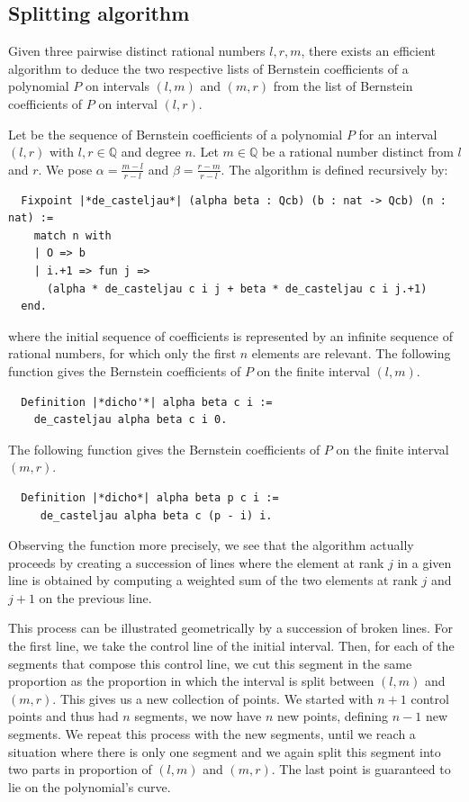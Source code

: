 \documentclass{mscs}
\begin{document}
\subsection{Splitting algorithm}\label{ssec:split}

Given three pairwise distinct rational numbers $l, r, m$,
there exists an efficient algorithm to deduce the two respective lists
of Bernstein coefficients of a polynomial $P$ on intervals $(l, m)$
and $(m, r)$ from the list of Bernstein coefficients of $P$ on
interval $(l, r)$.

Let  be the sequence of Bernstein coefficients of a polynomial $P$
for an interval \((l,r)\) with \(l, r\in \mathbb{Q}\) and degree \(n\).
Let $m\in \mathbb{Q}$ be a rational number
distinct from $l$ and $r$. We pose
$\alpha = \frac{m - l}{r - l}$ and $\beta = \frac{r - m}{r - l}$. The
 algorithm is defined recursively by:
\begin{lstlisting}
  Fixpoint |*de_casteljau*| (alpha beta : Qcb) (b : nat -> Qcb) (n : nat) :=
    match n with
    | O => b
    | i.+1 => fun j =>
      (alpha * de_casteljau c i j + beta * de_casteljau c i j.+1)
  end.
\end{lstlisting}
where the initial sequence of coefficients  is represented by an
infinite sequence of rational numbers, for which only the first $n$
elements are relevant.  The following function gives the Bernstein
coefficients of \(P\) on the finite interval \((l,m)\).
\begin{lstlisting}
  Definition |*dicho'*| alpha beta c i :=
    de_casteljau alpha beta c i 0.
\end{lstlisting}
The following function gives the Bernstein coefficients of \(P\) on the
finite interval \((m,r)\).
\begin{lstlisting}
  Definition |*dicho*| alpha beta p c i :=
     de_casteljau alpha beta c (p - i) i.
\end{lstlisting}

Observing the function 
more precisely, we see that the algorithm actually
proceeds by creating a succession of lines where the element at rank
\(j\) in a given line is obtained by computing a weighted sum of the two
elements at rank \(j\) and \(j+1\) on the previous line.

This process can be illustrated geometrically by a succession of broken
lines.
For the first line, we take the control line of the initial
interval.  Then, for each of the segments that compose this control line,
we cut this segment in the same proportion as the proportion in which
the interval is split between \((l,m)\) and \((m,r)\).  This gives us
a new collection of points.  We started with \(n + 1\) control points and
thus had \(n\) segments, we now have \(n\) new points, defining \(n-1\)
new segments.  We repeat this process with the new segments, until we reach
a situation where there is only one segment and we again split this
segment into two parts in proportion of \((l,m)\) and \((m,r)\).  The
last point is guaranteed to lie on the polynomial's curve.
\end{document}
